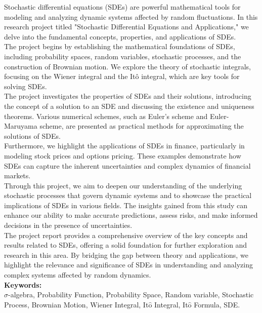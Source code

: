 \documentclass[twoside,final]{hcmut-report}
\begin{document}
Stochastic differential equations (SDEs) are powerful mathematical tools for modeling and analyzing dynamic systems affected by random fluctuations. In this research project titled "Stochastic Differential Equations and Applications," we delve into the fundamental concepts, properties, and applications of SDEs.\\
The project begins by establishing the mathematical foundations of SDEs, including probability spaces, random variables, stochastic processes, and the construction of Brownian motion. We explore the theory of stochastic integrals, focusing on the Wiener integral and the Itô integral, which are key tools for solving SDEs.\\
The project investigates the properties of SDEs and their solutions, introducing the concept of a solution to an SDE and discussing the existence and uniqueness theorems. Various numerical schemes, such as Euler's scheme and Euler-Maruyama scheme, are presented as practical methods for approximating the solutions of SDEs.\\
Furthermore, we highlight the applications of SDEs in finance, particularly in modeling stock prices and options pricing. These examples demonstrate how SDEs can capture the inherent uncertainties and complex dynamics of financial markets.\\
Through this project, we aim to deepen our understanding of the underlying stochastic processes that govern dynamic systems and to showcase the practical implications of SDEs in various fields. The insights gained from this study can enhance our ability to make accurate predictions, assess risks, and make informed decisions in the presence of uncertainties.\\
The project report provides a comprehensive overview of the key concepts and results related to SDEs, offering a solid foundation for further exploration and research in this area. By bridging the gap between theory and applications, we highlight the relevance and significance of SDEs in understanding and analyzing complex systems affected by random dynamics.\\
\textbf{Keywords:}\\ $\sigma$-algebra, Probability Function, Probability Space, Random variable, Stochastic Process, Brownian Motion, Wiener Integral, It$\hat{\text{o}}$ Integral, It$\hat{\text{o}}$ Formula, SDE.


\pagebreak
\tableofcontents

\pagebreak
\onehalfspacing
\end{document}
